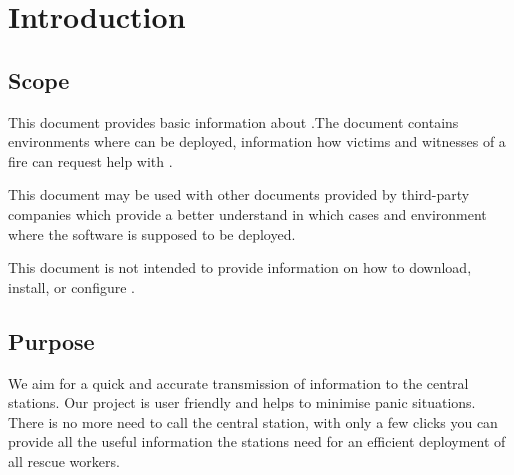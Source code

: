\chapter{Introduction}
\label{chap:introduction}

\section{Scope}

This document provides basic information about \mysystemname.The document
contains environments where \mysystemname can be deployed, information how
victims and witnesses of a fire can request help with \mysystemname.

This document may be used with other documents provided by third-party companies
which provide a better understand in which cases and environment
where the software \mysystemname is supposed to be deployed.

This document is not intended to provide information on how to download,
install, or configure \mysystemname.




 

 




\section{Purpose}
We aim for a quick and accurate transmission of information to the central
stations. Our project is user friendly and helps to minimise panic situations.
There is no more need to call the central station, with only a few clicks you can provide
all the useful information the stations need for an efficient deployment of all
rescue workers.

